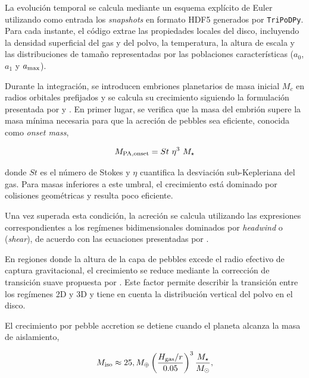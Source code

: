 La evolución temporal se calcula mediante un esquema explícito de Euler utilizando como entrada los \textit{snapshots} en formato HDF5 generados por \texttt{TriPoDPy}. Para cada instante, el código extrae las propiedades locales del disco, incluyendo la densidad superficial del gas y del polvo, la temperatura, la altura de escala y las distribuciones de tamaño representadas por las poblaciones características ($a_0$, $a_1$ y $a_{\rm max}$).


Durante la integración, se introducen embriones planetarios de masa inicial $M_c$ en radios orbitales prefijados y se calcula su crecimiento siguiendo la formulación presentada por \citet{Ormel2017} y \citet{Drazkowska2023}. En primer lugar, se verifica que la masa del embrión supere la masa mínima necesaria para que la acreción de pebbles sea eficiente, conocida como \textit{onset mass},

\begin{equation}
M_{\rm PA,onset}=St\text{ }\eta^3\text{ }M_\star 
\end{equation}

donde $St$ es el número de Stokes y $\eta$ cuantifica la desviación sub-Kepleriana del gas. Para masas inferiores a este umbral, el crecimiento está dominado por colisiones geométricas y resulta poco eficiente.

Una vez superada esta condición, la acreción se calcula utilizando las expresiones correspondientes a los regímenes bidimensionales dominados por \textit{headwind} o (\textit{shear}), de acuerdo con las ecuaciones presentadas por \citet[][Ecs. 7.9 y 7.13]{Ormel2017}.


En regiones donde la altura de la capa de pebbles excede el radio efectivo de captura gravitacional, el crecimiento se reduce mediante la corrección de transición suave propuesta por \citet[][Ec. 7.24]{Ormel2017}. Este factor permite describir la transición entre los regímenes 2D y 3D y tiene en cuenta la distribución vertical del polvo en el disco.


El crecimiento por pebble accretion se detiene cuando el planeta alcanza la masa de aislamiento,

\begin{equation}
M_{\rm iso}\approx25,M_\oplus
\left(\frac{H_{\rm gas}/r}{0.05}\right)^3
\frac{M_\star}{M_\odot},
\label{eq: Mass_isolation}
\end{equation}

